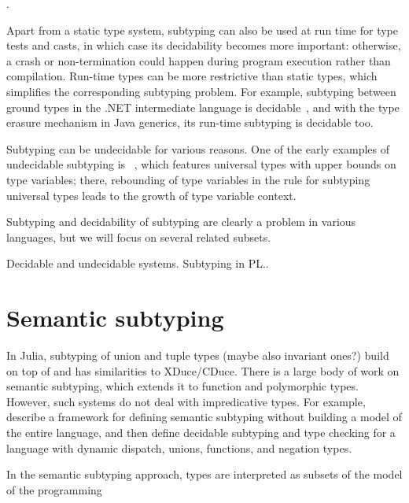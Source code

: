 \cite{hu:dot-undec:2020,mackay:bound-poly-sub-dec:2020,kennedy:nom-sub-var-dec:2007}.

Apart from a static type system,
subtyping can also be used at run time for type tests and casts,
in which case its decidability becomes more important: otherwise, a crash or
non-termination could happen during program execution rather than compilation.
Run-time types can be more restrictive than static types, which
simplifies the corresponding subtyping problem.
For example, subtyping between ground types in the .NET intermediate
language is decidable~\cite{kennedy:nom-sub-var-dec:2007},
and with the type erasure mechanism in Java generics,
its run-time subtyping is decidable too.

Subtyping can be undecidable for various reasons.
One of the early examples of undecidable subtyping is
\FSub~\cite{cardelli:fsub:1991,pierce:bound-sub-undec:1992},
which features universal types with upper bounds on type variables;
there, rebounding of type variables in the rule for subtyping universal types
leads to the growth of type variable context.







Subtyping and decidability of subtyping are clearly a problem in various languages,
but we will focus on several related subsets.

Decidable and undecidable systems. Subtyping in PL..

\section{Semantic subtyping}

In Julia, subtyping of union and tuple types (maybe also invariant ones?) build
on top of  and has similarities to XDuce/CDuce.
There is a large body of work on semantic subtyping, which extends it to
function and polymorphic types. However, such systems do not deal with
impredicative types.
For example, \citet{frih:sem-sub:2008} describe a framework for defining semantic
subtyping without building a model of the entire language, and then define
decidable subtyping and type checking for a language with dynamic dispatch,
unions, functions, and negation types.

In the semantic subtyping approach, types are interpreted as subsets of the
model of the programming

